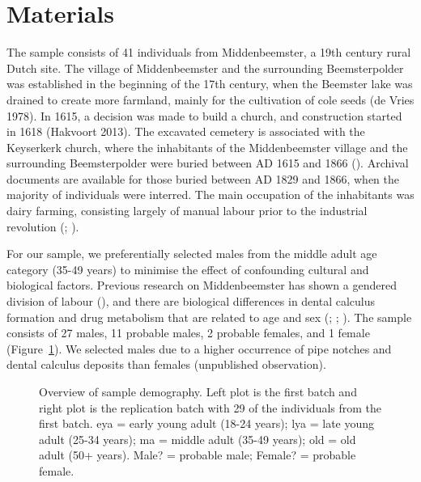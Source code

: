 \documentclass[
  b5paper,
]{book}
\begin{document}
\section{Materials}\label{mb11CalculusPilot-mat}

The sample consists of 41 individuals from Middenbeemster, a 19th
century rural Dutch site. The village of Middenbeemster and the
surrounding Beemsterpolder was established in the beginning of the 17th
century, when the Beemster lake was drained to create more farmland,
mainly for the cultivation of cole seeds (de Vries 1978). In 1615, a
decision was made to build a church, and construction started in 1618
(Hakvoort 2013). The excavated cemetery is associated with the
Keyserkerk church, where the inhabitants of the Middenbeemster village
and the surrounding Beemsterpolder were buried between AD 1615 and 1866
().
Archival documents are available for those buried between AD 1829 and
1866, when the majority of individuals were interred. The main
occupation of the inhabitants was dairy farming, consisting largely of
manual labour prior to the industrial revolution
(;
).

For our sample, we preferentially selected males from the middle adult
age category (35-49 years) to minimise the effect of confounding
cultural and biological factors. Previous research on Middenbeemster has
shown a gendered division of labour
(),
and there are biological differences in dental calculus formation and
drug metabolism that are related to age and sex
(;
;
). The sample
consists of 27 males, 11 probable males, 2 probable females, and 1
female (Figure~\ref{fig-sample-demography}). We selected males due to a
higher occurrence of pipe notches and dental calculus deposits than
females (unpublished observation).

\begin{figure}


\caption{\label{fig-sample-demography}Overview of sample demography.
Left plot is the first batch and right plot is the replication batch
with 29 of the individuals from the first batch. eya = early young adult
(18-24 years); lya = late young adult (25-34 years); ma = middle adult
(35-49 years); old = old adult (50+ years). Male? = probable male;
Female? = probable female.}

\end{figure}%
\end{document}
